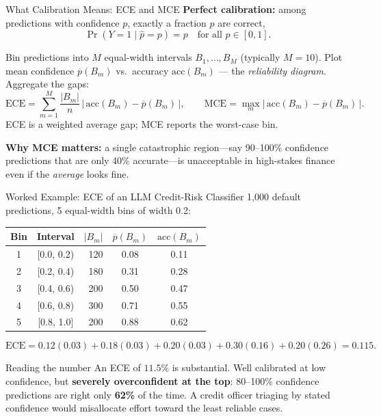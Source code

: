 \documentclass[9pt,t]{beamer}
\begin{document}
\begin{frame}{What Calibration Means: ECE and MCE}
\textbf{Perfect calibration:} among predictions with confidence $p$, exactly a
fraction $p$ are correct,
\[
  \Pr(Y = 1 \mid \hat{p} = p) = p \quad \text{for all } p \in [0,1].
\]

\begin{underhood}
Bin predictions into $M$ equal-width intervals $B_1,\dots,B_M$ (typically
$M=10$). Plot mean confidence $\overline{p}(B_m)$ vs.\ accuracy
$\text{acc}(B_m)$ --- the \emph{reliability diagram}. Aggregate the gaps:
\[
  \text{ECE} = \sum_{m=1}^{M} \frac{|B_m|}{n}\,
  \bigl|\,\text{acc}(B_m) - \overline{p}(B_m)\,\bigr|,
  \qquad
  \text{MCE} = \max_m \bigl|\,\text{acc}(B_m) - \overline{p}(B_m)\,\bigr|.
\]
ECE is a weighted average gap; MCE reports the worst-case bin.
\end{underhood}

\medskip
\textbf{Why MCE matters:} a single catastrophic region---say 90--100\%
confidence predictions that are only 40\% accurate---is unacceptable in
high-stakes finance even if the \emph{average} looks fine.
\end{frame}

\begin{frame}{Worked Example: ECE of an LLM Credit-Risk Classifier}
1{,}000 default predictions, 5 equal-width bins of width 0.2:

\medskip
\centering
\begin{tabular}{ccrcc}
\toprule
Bin & Interval & $|B_m|$ & $\overline{p}(B_m)$ & $\text{acc}(B_m)$ \\
\midrule
1 & [0.0, 0.2) & 120 & 0.08 & 0.11 \\
2 & [0.2, 0.4) & 180 & 0.31 & 0.28 \\
3 & [0.4, 0.6) & 200 & 0.50 & 0.47 \\
4 & [0.6, 0.8) & 300 & 0.71 & 0.55 \\
5 & [0.8, 1.0] & 200 & 0.88 & 0.62 \\
\bottomrule
\end{tabular}

\medskip
\raggedright
\[
  \text{ECE} = 0.12(0.03) + 0.18(0.03) + 0.20(0.03) + 0.30(0.16) + 0.20(0.26)
  = \mathbf{0.115}.
\]

\begin{alertblock}{Reading the number}
An ECE of $11.5\%$ is substantial. Well calibrated at low confidence, but
\textbf{severely overconfident at the top}: 80--100\% confidence predictions
are right only \textbf{62\%} of the time. A credit officer triaging by stated
confidence would misallocate effort toward the least reliable cases.
\end{alertblock}
\end{frame}
\end{document}
